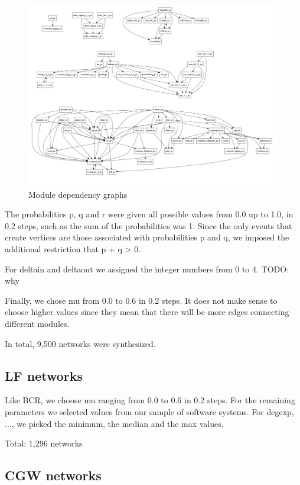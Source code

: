 \begin{figure}[!t]
\centering
\includegraphics[width=1.0\textwidth]{architectures}
\caption{Module dependency graphs}
\label{fig:architectures}
\end{figure}


The probabilities p, q and r were given all possible values from 0.0 up to 1.0,
in 0.2 steps, such as the sum of the probabilities was 1. Since the only events
that create vertices are those associated with probabilities p and q, we imposed
the additional restriction that p + q > 0.

For deltain and deltaout we assigned the integer numbers from 0 to 4. TODO: why

Finally, we chose mu from 0.0 to 0.6 in 0.2 steps. It does not make sense to
choose higher values since they mean that there will be more edges connecting
different modules.

In total, 9,500 networks were synthesized.

\subsection{LF networks}

Like BCR, we choose mu ranging from 0.0 to 0.6 in 0.2 steps. For the remaining
parameters we selected values from our sample of software systems. For degexp,
..., we picked the minimum, the median and the max values.

Total: 1,296 networks

\subsection{CGW networks}

